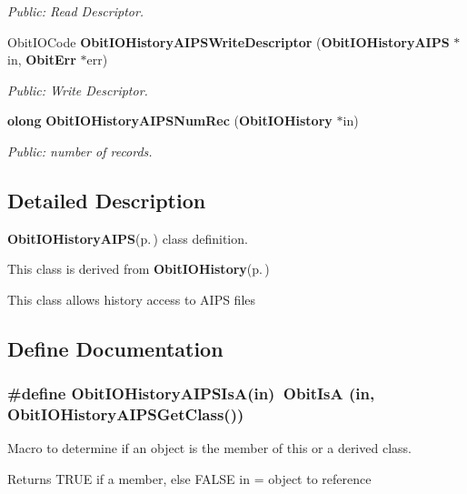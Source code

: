 \begin{CompactItemize}
\begin{CompactList}\small\item\em Public: Read Descriptor. \item\end{CompactList}\item 
Obit\-IOCode {\bf Obit\-IOHistory\-AIPSWrite\-Descriptor} ({\bf Obit\-IOHistory\-AIPS} $\ast$in, {\bf Obit\-Err} $\ast$err)
\begin{CompactList}\small\item\em Public: Write Descriptor. \item\end{CompactList}\item 
{\bf olong} {\bf Obit\-IOHistory\-AIPSNum\-Rec} ({\bf Obit\-IOHistory} $\ast$in)
\begin{CompactList}\small\item\em Public: number of records. \item\end{CompactList}\end{CompactItemize}


\subsection{Detailed Description}
{\bf Obit\-IOHistory\-AIPS}{\rm (p.\,\pageref{structObitIOHistoryAIPS})} class definition. 

This class is derived from {\bf Obit\-IOHistory}{\rm (p.\,\pageref{structObitIOHistory})}

This class allows history access to AIPS files

\subsection{Define Documentation}
\subsubsection{\setlength{\rightskip}{0pt plus 5cm}\#define Obit\-IOHistory\-AIPSIs\-A(in)\ Obit\-Is\-A (in, Obit\-IOHistory\-AIPSGet\-Class())}\label{ObitIOHistoryAIPS_8h_a2}


Macro to determine if an object is the member of this or a derived class. 

Returns TRUE if a member, else FALSE in = object to reference 
